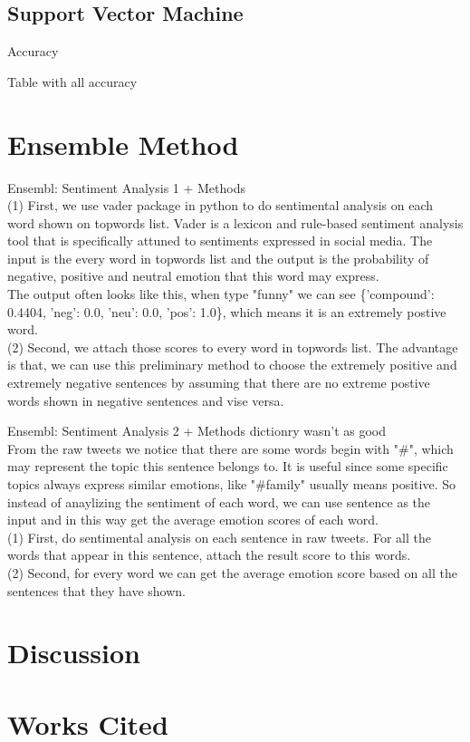 \documentclass[]{article}
\begin{document}
\subsection{Support Vector Machine}



Accuracy 

Table with all accuracy 

\section{Ensemble Method}
Ensembl: Sentiment Analysis 1 + Methods \\
(1) First, we use vader package in python to do sentimental analysis on each word shown on topwords list. Vader is a lexicon and rule-based sentiment analysis tool that is specifically attuned to sentiments expressed in social media.
The input is the every word in topwords list and the output is the probability of negative, positive and neutral emotion that this word may express. \\
The output often looks like this, when type "funny" we can see \{'compound': 0.4404, 'neg': 0.0, 'neu': 0.0, 'pos': 1.0\}, which means it is an extremely postive word. \\
(2) Second, we attach those scores to every word in topwords list. The advantage is that, we can use this preliminary method to choose the extremely positive and extremely negative sentences by assuming that there are no
extreme postive words shown in negative sentences and vise versa. 

Ensembl: Sentiment Analysis 2 + Methods
dictionry wasn't as good \\
From the raw tweets we notice that there are some words begin with "#", which may represent the topic this sentence belongs to. It is useful since some specific topics always express similar emotions, like "#family" usually means positive.
So instead of anaylizing the sentiment of each word, we can use sentence as the input and in this way get the average emotion scores of each word.\\
(1) First, do sentimental analysis on each sentence in raw tweets. For all the words that appear in this sentence, attach the result score to this words. \\
(2) Second, for every word we can get the average emotion score based on all the sentences that they have shown.





\section{Discussion}

\section{Works Cited}
\begin{thebibliography}{1}


\end{thebibliography}
\end{document}
